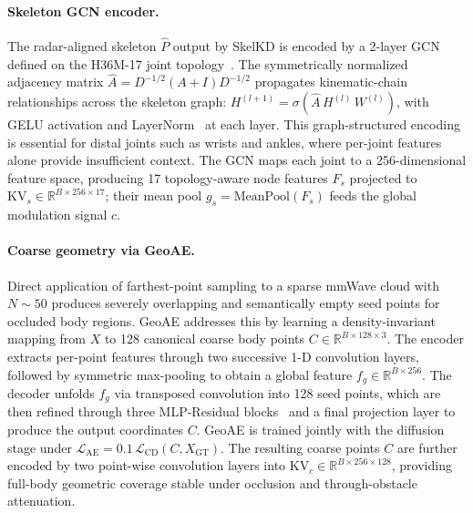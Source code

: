 \documentclass{article}
\newcommand{\Rbb}{\mathbb{R}}
\begin{document}
\paragraph{Skeleton GCN encoder.}
The radar-aligned skeleton $\hat{P}$ output by SkelKD is encoded by a 2-layer
GCN~\cite{gcn} defined on the H36M-17 joint topology~\cite{h36m}.
The symmetrically normalized adjacency matrix
$\hat{A} = D^{-1/2}(A+I)D^{-1/2}$ propagates kinematic-chain relationships
across the skeleton graph:
$H^{(l+1)} = \sigma\!\left(\hat{A}\,H^{(l)}\,W^{(l)}\right)$,
with GELU activation and LayerNorm~\cite{layernorm} at each layer.
This graph-structured encoding is essential for distal joints such as wrists
and ankles, where per-joint features alone provide insufficient context.
The GCN maps each joint to a 256-dimensional feature space,
producing 17 topology-aware node features $F_s$ projected to
$\mathrm{KV}_s\!\in\!\Rbb^{B\times256\times17}$;
their mean pool $g_s\!=\!\mathrm{MeanPool}(F_s)$ feeds the global modulation
signal $c$.

\paragraph{Coarse geometry via GeoAE.}
Direct application of farthest-point sampling to a sparse mmWave cloud
with $N\!\sim\!50$ produces severely overlapping and semantically empty seed
points for occluded body regions.
GeoAE addresses this by learning a density-invariant
mapping from $X$ to 128 canonical coarse body points
$C\!\in\!\Rbb^{B\times128\times3}$.
The encoder extracts per-point features through two successive 1-D convolution
layers, followed by symmetric max-pooling to obtain a global feature $f_g\!\in\!\Rbb^{B\times256}$.
The decoder unfolds $f_g$ via transposed convolution into 128 seed points,
which are then refined through three MLP-Residual blocks~\cite{resnet} and a final projection
layer to produce the output coordinates $C$.
GeoAE is trained jointly with the diffusion stage under
$\mathcal{L}_\text{AE} = 0.1\,\mathcal{L}_\text{CD}(C, X_\text{GT})$.
The resulting coarse points $C$ are further encoded by two point-wise
convolution layers into $\mathrm{KV}_c\!\in\!\Rbb^{B\times256\times128}$,
providing full-body geometric coverage stable under occlusion and
through-obstacle attenuation.
\end{document}
